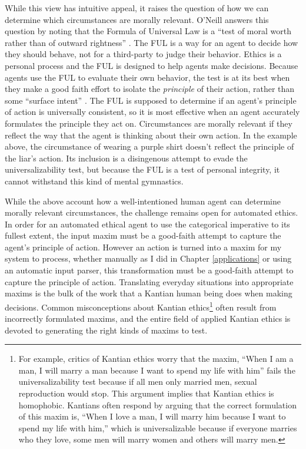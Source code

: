 \begin{isabellebody}
\begin{isamarkuptext}
While this view has intuitive appeal, it raises the question of how we can determine
which circumstances are morally relevant. O'Neill answers this question by noting that the Formula of Universal Law is 
a ``test of moral worth rather than of outward rightness'' \citep[98]{constofreason}. The FUL is a way 
for an agent to decide how they should behave, not for a third-party to judge their behavior. Ethics is 
a personal process and the FUL is designed to help agents make decisions. Because agents use 
the FUL to evaluate their own behavior, the test is at its 
best when they make a good faith effort to isolate the \emph{principle} of their action, rather than some
``surface intent'' \citep[87]{constofreason}. The FUL is supposed to determine if an agent's principle of action
is universally consistent, so it is most effective when an agent accurately formulates the principle
they act on. Circumstances are morally relevant if they reflect the way that the agent is 
thinking about their own action. In the example above, the circumstance of wearing a purple shirt doesn't reflect
the principle of the liar's action. Its inclusion is a disingenous attempt to evade the universalizability
test, but because the FUL is a test of personal integrity, it cannot withstand this kind of mental
gymnastics.

While the above account how a well-intentioned human agent can determine 
morally relevant circumstances, the challenge remains open for automated ethics. In order for an automated
ethical agent to use the categorical imperative to its fullest extent, the input maxim must be a good-faith 
attempt to capture the agent's principle
of action. However an action is turned into a maxim for my system to process, whether manually as I did
in Chapter \ref{applications} or using an automatic input parser, this transformation must be a good-faith 
attempt to capture the principle of action. Translating everyday situations into appropriate maxims is 
the bulk of the work that a Kantian human 
being does when making decisions. Common misconceptions about Kantian ethics\footnote{For example, critics 
of Kantian ethics worry that the maxim, ``When I am a
man, I will marry a man because I want to spend my life with him'' fails the universalizability
test because if all men only married men, sexual reproduction would stop. This argument implies 
that Kantian ethics is homophobic. Kantians often respond by arguing that the correct formulation of 
this maxim is, ``When I love a man, I will marry him because I want to spend my life with him,'' which
is universalizable because if everyone marries who they love, some men will marry women and others will
marry men.} often result from incorrectly formulated maxims, 
and the entire field of applied Kantian ethics is devoted to generating the right kinds of maxims to test. 


\end{isamarkuptext}
\end{isabellebody}
